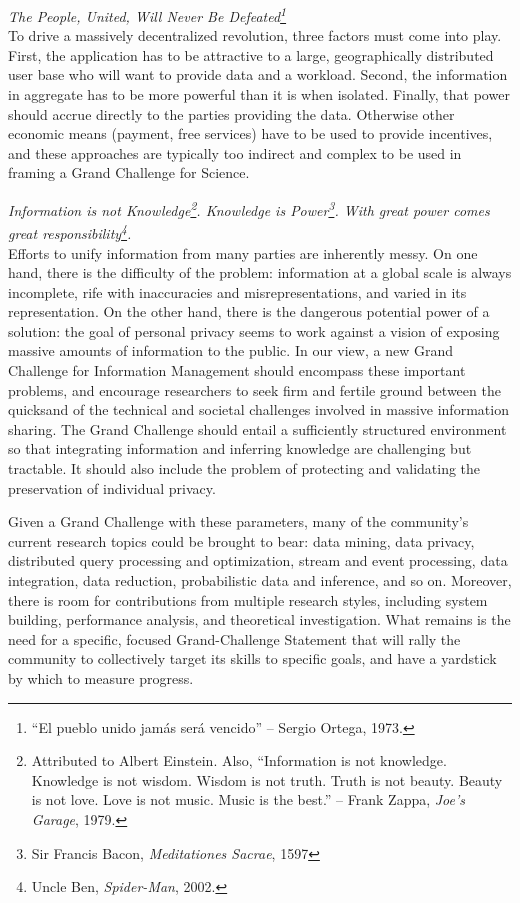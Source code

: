 \documentclass{acm_proc_article-sp}
\begin{document}
 {\em The People, United, Will Never Be Defeated\footnote{``El pueblo unido jam\'as ser\'a vencido'' -- Sergio Ortega, 1973.}} \\
To drive a massively decentralized revolution, three factors must come into play. First, the application has to be attractive to a large, geographically distributed user base who will want to provide data and a workload. Second, the information in aggregate has to be more powerful than it is when isolated. Finally, that power should accrue directly to the parties providing the data. Otherwise other economic means (payment, free services) have to be used to provide incentives, and these approaches are typically too indirect and complex to be used in framing a Grand Challenge for Science. 

 {\em Information is not Knowledge\footnote{Attributed to Albert Einstein. Also, ``Information is not knowledge. Knowledge is not wisdom. Wisdom is not truth. Truth is not beauty. Beauty is not love. Love is not music. Music is the best.'' -- Frank Zappa, {\em Joe's Garage}, 1979.}. Knowledge is Power\footnote{Sir Francis Bacon, {\em Meditationes Sacrae}, 1597}. With great power comes great responsibility\footnote{Uncle Ben, {\em Spider-Man}, 2002.}.} \\
Efforts to unify information from many parties are inherently messy. On one hand, there is the difficulty of the problem: information at a global scale is always incomplete, rife with inaccuracies and misrepresentations, and varied in its representation. 
On the other hand, there is the dangerous potential power of a solution:
the goal of personal privacy seems to work against a vision of exposing
massive amounts of information to the public. In our view, a new Grand
Challenge for Information Management should encompass these important
problems, and encourage researchers to seek firm and fertile ground
between the quicksand of the technical and societal challenges involved
in massive information sharing. The Grand Challenge should entail a
sufficiently structured environment so that integrating information and
inferring knowledge are challenging but tractable. It should also include the problem of protecting and validating the preservation of individual privacy.

Given a Grand Challenge with these parameters, many of the community's
current research topics could be brought to bear: data mining, data
privacy, distributed query processing and optimization, stream and event
processing, data integration, data reduction, probabilistic data and
inference, and so on. Moreover, there is room for contributions from
multiple research styles, including system building, performance
analysis, and theoretical investigation. What remains is the need for a
specific, focused Grand-Challenge Statement that will rally the community to collectively target its skills to specific goals, and have a yardstick by which to measure progress.
\end{document}

